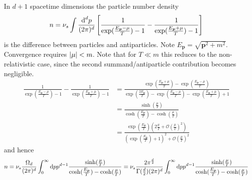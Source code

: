 In $d+1$ spacetime dimensions the particle number density
\begin{equation}
    n=\nu_s\int\frac{\text{d}^dp}{(2\pi)^d}\left[\frac{1}{\exp(\frac{E_{{\boldsymbol{p}}}-\mu}{T})-1}-\frac{1}{\exp(\frac{E_{{\boldsymbol{p}}}+\mu}{T})-1}\right]
\end{equation}
is the difference between particles and antiparticles. Note $E_{\mathbf{p}}=\sqrt{\mathbf{p}^2+m^2}$. Convergence requires ${\vert\mu\vert}<m$. \done{} Note that for $T\ll m$ this reduces to the non-relativistic case, since the second summand/antiparticle contribution becomes negligible.
\begin{subequations}
    \begin{align}
        \frac{1}{\exp(\frac{E_{\mathbf{p}}-\mu}{T})-1}-\frac{1}{\exp(\frac{E_{\mathbf{p}}+\mu}{T})-1} & =\frac{\exp(\frac{E_{\mathbf{p}}+\mu}{T})-\exp(\frac{E_{\mathbf{p}}-\mu}{T})}{\exp(\frac{2E_{\mathbf{p}}}{T})-\exp(\frac{E_{\mathbf{p}}-\mu}{T})-\exp(\frac{E_{\mathbf{p}}+\mu}{T})+1} \\
                                                                                                      & =\frac{\sinh(\frac{\mu}{T})}{\cosh(\frac{E_\mathbf{p}}{T})-\cosh(\frac{\mu}{T})}                                                                                                       \\
                                                                                                      & =\frac{\exp(\frac{E_{\mathbf{p}}}{T})(2\frac{\mu}{T}+\mathcal{O}(\frac{\mu}{T})^2)}{(\exp(\frac{E_{\mathbf{p}}}{T})+1)^2+\mathcal{O}(\frac{\mu}{T})^2}
    \end{align}
\end{subequations}
and hence
\begin{equation}
    n=\nu_s\frac{\Omega_{d}}{(2\pi)^d}\int_0^\infty\text{d} pp^{d-1}\frac{\sinh(\frac{\mu}{T})}{\cosh(\frac{E_{\boldsymbol{p}}}{T})-\cosh(\frac{\mu}{T})}=\nu_s\frac{2\pi^\frac{d}{2}}{\Gamma(\frac{d}{2})(2\pi)^d}\int_0^\infty\text{d} pp^{d-1}\frac{\sinh(\frac{\mu}{T})}{\cosh(\frac{E_{\boldsymbol{p}}}{T})-\cosh(\frac{\mu}{T})}
\end{equation}

